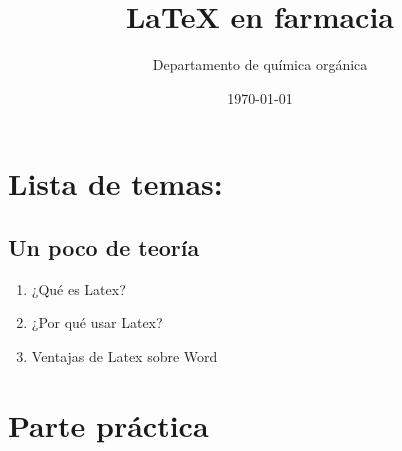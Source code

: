 \documentclass[12pt,letterpaper]{article}
\title{\LaTeX \hspace{0.1cm} en farmacia}
\author{Departamento de química orgánica}
\date{\today}
\begin{document}
\maketitle

\section{Lista de temas:}

\subsection{Un poco de teoría}

\begin{enumerate}
    \item ¿Qué es Latex?
    \item ¿Por qué usar Latex?
    \item Ventajas de Latex sobre Word
\end{enumerate}

\section{Parte práctica}
\end{document}
